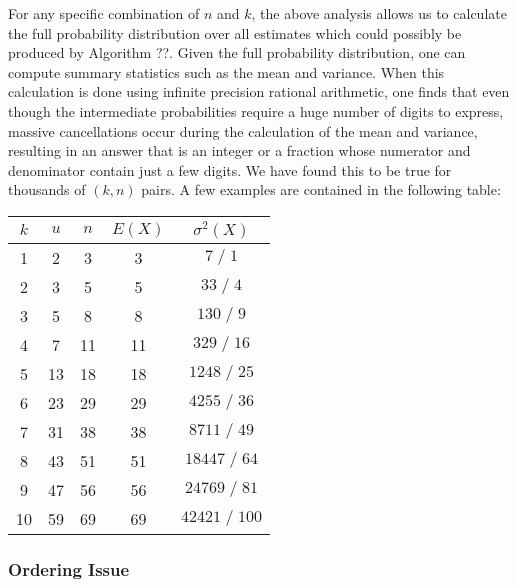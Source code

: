 \documentclass{sig-alternate}
\begin{document}
For any specific combination of $n$ and $k$, the above analysis allows
us to calculate the full probability distribution over all estimates
which could possibly be produced by Algorithm ??. Given the full probability
distribution, one can compute summary statistics such as the mean
and variance. When this calculation is done using infinite precision rational
arithmetic, one finds that even though the intermediate probabilities require
a huge number of digits to express, massive cancellations occur during the calculation
of the mean and variance, resulting in an answer that is an integer or a fraction whose
numerator and denominator contain just a few digits. We have found this to be true
for thousands of $(k,n)$ pairs. A few examples are contained in the following table:

\begin{center}
{\footnotesize
\begin{tabular}{|c|c|c|c|c|}
\hline 
$k$ & $u$ & $n$ & $E(X)$ & $\sigma^2(X)$ \\
\hline 
 1 & 2 & 3 & 3 & $7 \; / \; 1$ \\
 2 & 3 & 5 & 5 & $33 \; / \; 4$ \\
 3 & 5 & 8 & 8 & $130 \; / \; 9$ \\
 4 & 7 & 11 & 11 & $329 \; / \; 16$ \\
 5 & 13 & 18 & 18 & $1248 \; / \; 25$ \\
 6 & 23 & 29 & 29 & $4255 \; / \; 36$ \\
 7 & 31 & 38 & 38 & $8711 \; / \; 49$ \\
 8 & 43 & 51 & 51 & $18447 \; / \; 64$ \\
 9 & 47 & 56 & 56 & $24769 \; / \; 81$ \\
 10 & 59 & 69 & 69 & $42421 \; / \; 100$ \\
\hline                                                          
\end{tabular}}
\end{center}


\subsubsection{Ordering Issue}
\end{document}

